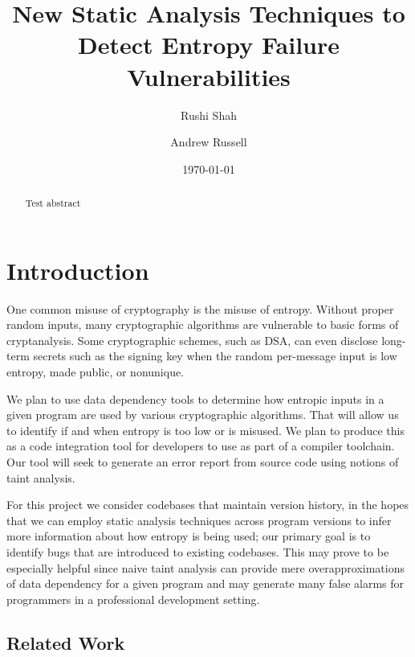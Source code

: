 \documentclass[letterpaper,twocolumn,10pt]{article}
\begin{document}
\date{\today}

\title{\Large \bf New Static Analysis Techniques to Detect Entropy Failure Vulnerabilities}

\author{
{\rm Rushi Shah}
\and
{\rm Andrew Russell}
}

\maketitle

\begin{abstract}
 Test abstract
\end{abstract}

\section{Introduction}

One common misuse of cryptography is the misuse of entropy. Without proper random inputs, many cryptographic algorithms
are vulnerable to basic forms of cryptanalysis. Some cryptographic schemes, such as DSA, can even disclose long-term secrets
such as the signing key when the random per-message input is low entropy, made public, or nonunique.

We plan to use data dependency tools to determine how entropic inputs in a given program are used by various cryptographic algorithms. That will allow us to identify if and when entropy is too low or is misused. We plan to produce this as a code integration tool for developers to use as part of a compiler toolchain.
Our tool will seek to generate an error report from source code using notions of taint analysis. 

For this project we consider codebases that maintain version history, in the hopes that we can employ static analysis techniques across program versions to infer more information about how entropy is being used; 
our primary goal is to identify bugs that are introduced to existing codebases. This may prove to be especially helpful since naive taint analysis can provide mere overapproximations of data dependency for a given program and may generate many false alarms for programmers in a professional development setting.

\subsection{Related Work}
\end{document}
